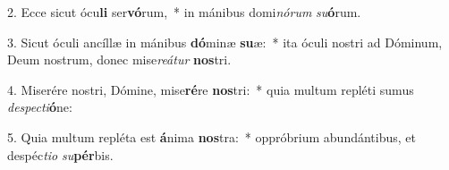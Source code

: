 2. Ecce sicut ócu\textbf{li} ser\textbf{vó}rum,~*  in mánibus domi\textit{nó}\textit{rum} \textit{su}\textbf{ó}rum.\

3. Sicut óculi ancíllæ in mánibus \textbf{dó}minæ \textbf{su}æ:~*  ita óculi nostri ad Dóminum, Deum nostrum, donec mise\textit{re}\textit{á}\textit{tur} \textbf{nos}tri.\

4. Miserére nostri, Dómine, mise\textbf{ré}re \textbf{nos}tri:~*  quia multum repléti sumus \textit{de}\textit{spec}\textit{ti}\textbf{ó}ne:\

5. Quia multum repléta est \textbf{á}nima \textbf{nos}tra:~*  oppróbrium abundántibus, et despéc\textit{ti}\textit{o} \textit{su}\textbf{pér}bis.\

